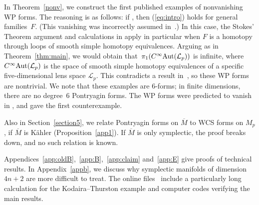 \documentclass[10pt,a4paper]{amsart}
\numberwithin{equation}{section}
\theoremstyle{definition}
\newcommand{\ocs}{\widetilde{{\rm CS}}}
\newcommand{\om}{\overline{M}}
\begin{document}
In Theorem~\ref{nonv}, we construct the first published examples of nonvanishing WP forms. The reasoning is as follows: if
\smash{$0= {\rm d}_{LM}\ocs{}^{\rm W}_{2k-1} \in \Lambda^{2k}(LM)$}, then (\ref{eq:intro}) holds for general families~$F$. (This vanishing was incorrectly assumed in~\cite{MRT4}.) In this case, the Stokes' Theorem argument and calculations in \cite[Section~3]{MRT4} apply in particular when $F$ is a homotopy through loops of smooth simple homotopy equivalences. Arguing as in Theorem~\ref{thm:main}, we would obtain that~$\pi_1(C^\infty{\rm Aut}(\mathcal{L}_p))$ is infinite, where $C^\infty{\rm Aut}(\mathcal{L}_p)$ is the space of smooth simple homotopy equivalences of a specific
five-dimensional lens space $\mathcal{L}_p$. This contradicts a result in~\cite{HJ}, so these WP forms are nontrivial. We note that these examples are $6$-forms; in finite dimensions, there are no degree~$6$ Pontryagin forms. The WP forms were predicted to vanish in \cite{lrst}, and \cite{alh-unpublished} gave the first counterexample.

Also in Section~\ref{section5}, we relate Pontryagin forms on $\om$ to WCS forms on
$M_p$, if $\om$ is K\"ahler (Proposition~\ref{app1}). If $\om$ is only symplectic, the proof breaks down, and no such relation is known.

Appendices~\ref{app:oldB},~\ref{app:B},~\ref{app:claim} and~\ref{app:E} give proofs of technical results. In Appendix~\ref{appb},
we discuss why symplectic manifolds of dimension $4n+2$ are more difficult to treat. The online files~\cite{Egi1, Egi3} include a particularly long calculation for the Kodaira--Thurston example and computer codes verifying the main results.
\end{document}
